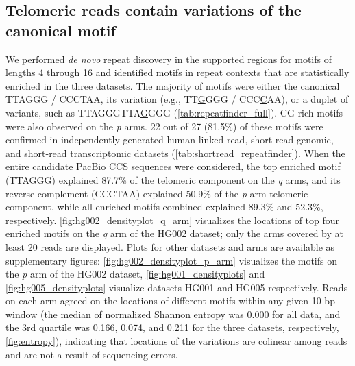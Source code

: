 \documentclass{article}
\begin{document}
\subsection*{Telomeric reads contain variations of the canonical motif}
We performed \textit{de novo} repeat discovery in the supported regions for motifs of lengths 4 through 16 and identified motifs in repeat contexts that are statistically enriched in the three datasets.
The majority of motifs were either the canonical TTAGGG / CCCTAA, its variation (e.g., TT\underline{G}GGG / CCC\underline{C}AA), or a duplet of variants, such as TTAGGGTTA\underline{G}GGG (\autoref{tab:repeatfinder_full}).
CG-rich motifs were also observed on the \textit{p} arms.
22 out of 27 (81.5\%) of these motifs were confirmed in independently generated human linked-read, short-read genomic, and short-read transcriptomic datasets (\autoref{tab:shortread_repeatfinder}).
When the entire candidate PacBio CCS sequences were considered, the top enriched motif (TTAGGG) explained 87.7\% of the telomeric component on the \textit{q} arms, and its reverse complement (CCCTAA) explained 50.9\% of the \textit{p} arm telomeric component, while all enriched motifs combined explained 89.3\% and 52.3\%, respectively.
\autoref{fig:hg002_densityplot_q_arm} visualizes the locations of top four enriched motifs on the \textit{q} arm of the HG002 dataset; only the arms covered by at least 20 reads are displayed.
Plots for other datasets and arms are available as supplementary figures: \autoref{fig:hg002_densityplot_p_arm} visualizes the motifs on the \textit{p} arm of the HG002 dataset, \autoref{fig:hg001_densityplots} and \autoref{fig:hg005_densityplots} visualize datasets HG001 and HG005 respectively.
Reads on each arm agreed on the locations of different motifs within any given 10 bp window (the median of normalized Shannon entropy was 0.000 for all data, and the 3rd quartile was 0.166, 0.074, and 0.211 for the three datasets, respectively, \autoref{fig:entropy}), indicating that locations of the variations are colinear among reads and are not a result of sequencing errors.
\end{document}
